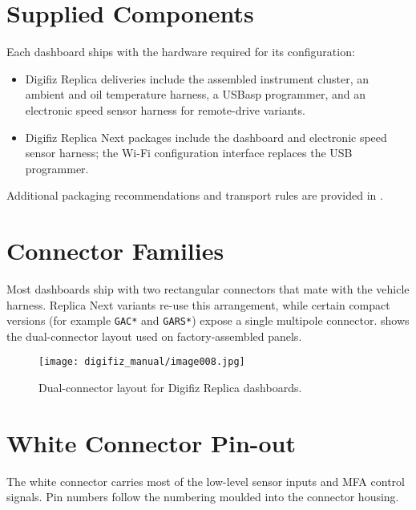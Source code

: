 \section{Supplied Components}

Each dashboard ships with the hardware required for its configuration:
\begin{itemize}
    \item Digifiz Replica deliveries include the assembled instrument cluster, an ambient and oil temperature harness, a USBasp programmer, and an electronic speed sensor harness for remote-drive variants.
    \item Digifiz Replica Next packages include the dashboard and electronic speed sensor harness; the Wi-Fi configuration interface replaces the USB programmer.
\end{itemize}

Additional packaging recommendations and transport rules are provided in .

\section{Connector Families}

Most dashboards ship with two rectangular connectors that mate with the vehicle harness.
Replica Next variants re-use this arrangement, while certain compact versions (for example \texttt{GAC*} and \texttt{GARS*}) expose a single multipole connector.
 shows the dual-connector layout used on factory-assembled panels.

\begin{figure}[htbp]
    \centering
    \texttt{[image: digifiz\_manual/image008.jpg]}
    \caption{Dual-connector layout for Digifiz Replica dashboards.}
    \label{fig:dual-connector-layout}
\end{figure}

\section{White Connector Pin-out}

The white connector carries most of the low-level sensor inputs and MFA control signals.
Pin numbers follow the numbering moulded into the connector housing.

